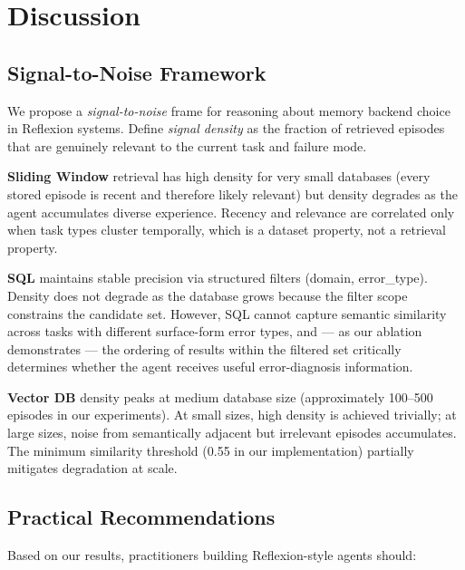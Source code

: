 \documentclass{article}
\begin{document}
\section{Discussion}
\label{sec:discussion}

\subsection{Signal-to-Noise Framework}

We propose a \emph{signal-to-noise} frame for reasoning about memory backend
choice in Reflexion systems. Define \emph{signal density} as the fraction of
retrieved episodes that are genuinely relevant to the current task and failure
mode.

\textbf{Sliding Window} retrieval has high density for very small databases
(every stored episode is recent and therefore likely relevant) but density
degrades as the agent accumulates diverse experience. Recency and relevance
are correlated only when task types cluster temporally, which is a dataset
property, not a retrieval property.

\textbf{SQL} maintains stable precision via structured filters (domain,
error\_type). Density does not degrade as the database grows because the filter
scope constrains the candidate set. However, SQL cannot capture semantic
similarity across tasks with different surface-form error types, and --- as our
ablation demonstrates --- the ordering of results within the filtered set
critically determines whether the agent receives useful error-diagnosis
information.

\textbf{Vector DB} density peaks at medium database size (approximately
100--500 episodes in our experiments). At small sizes, high density is achieved
trivially; at large sizes, noise from semantically adjacent but irrelevant
episodes accumulates. The minimum similarity threshold (0.55 in our
implementation) partially mitigates degradation at scale.

\subsection{Practical Recommendations}

Based on our results, practitioners building Reflexion-style agents should:
\end{document}
